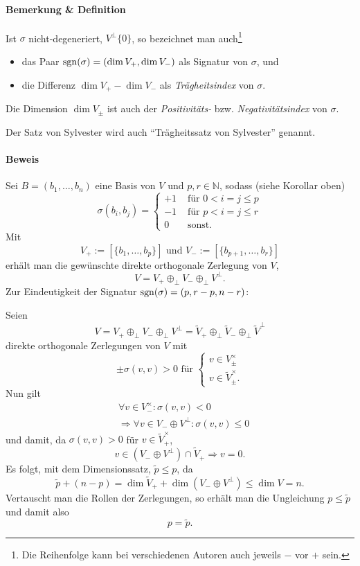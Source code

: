 \paragraph{Bemerkung \& Definition}
	Ist $ \sigma $ nicht-degeneriert, $ V^\perp \{0\} $, so bezeichnet man auch\footnote{Die Reihenfolge kann bei verschiedenen Autoren auch jeweils $ - $ vor $ + $ sein.}
		\begin{itemize}
			\item das Paar $ \operatorname{sgn} (\sigma) =(\dim V_+,\dim V_-)$ als Signatur von $ \sigma $, und
			\item die Differenz $ \dim V_+ - \dim V_- $ als \emph{Trägheitsindex} von $ \sigma $.
		\end{itemize}
	Die Dimension $ \dim V_\pm $ ist auch der \emph{Positivitäts-} bzw. \emph{Negativitätsindex} von $ \sigma $.
	
	Der Satz von Sylvester wird auch "`Trägheitssatz von Sylvester"' genannt.
\paragraph{Beweis}
	Sei $ B=(b_1,\dots,b_n) $ eine Basis von $ V $ und $ p,r\in \mathbb{N} $, sodass (siehe Korollar oben)
		\[ \sigma(b_i,b_j) =
		\begin{cases}
			+1 & \text{ für } 0 < i=j\leq p\\
			-1 & \text{ für } p < i=j\leq r\\
			0 & \text{ sonst. }
		\end{cases} \]
	Mit
		\[ V_+ := [\{b_1,\dots,b_p \}] \text{ und } V_- := [\{b_{p+1},\dots,b_r\}] \]
	erhält man die gewünschte direkte orthogonale Zerlegung von $ V $,
		\[ V = V_+ \oplus_\perp V_- \oplus_\perp V^\perp. \]
	Zur Eindeutigkeit der Signatur $ \operatorname{sgn}(\sigma) = (p,r-p,n-r) $:
	
	Seien
	\[ V=V_+ \oplus_\perp V_- \oplus_\perp V^\perp
	= \tilde{V}_+\oplus_\perp\tilde{V}_-\oplus_\perp\tilde{V}^\perp \]
	direkte orthogonale Zerlegungen von $ V $ mit
		\[ \pm \sigma(v,v)>0 \text{ für }
			\begin{cases}
				v\in V_\pm^\times\\
				v\in \tilde{V}_\pm^\times.
			\end{cases} \]
	Nun gilt
	\begin{align*}
		&\forall v\in V_-^\times: \sigma(v,v)< 0 \\
		&\Rightarrow \forall v\in V_- \oplus V^\perp: \sigma(v,v) \leq 0
	\end{align*}
	und damit, da $ \sigma(v,v)>0 $ für $ v\in \tilde{V}_+^\times $,
		\[ v\in (V_-\oplus V^\perp)\cap \tilde{V}_+ \Rightarrow v= 0. \]
	Es folgt, mit dem Dimensionssatz, $ \tilde{p}\leq p $, da
		\[ \tilde{p}+(n-p) = \dim \tilde{V}_+ + \dim(V_-\oplus V^\perp) \leq \dim V = n. \]
	Vertauscht man die Rollen der Zerlegungen, so erhält man die Ungleichung $ p\leq \tilde{p} $ und damit also
		\[ p = \tilde{p}. \]
